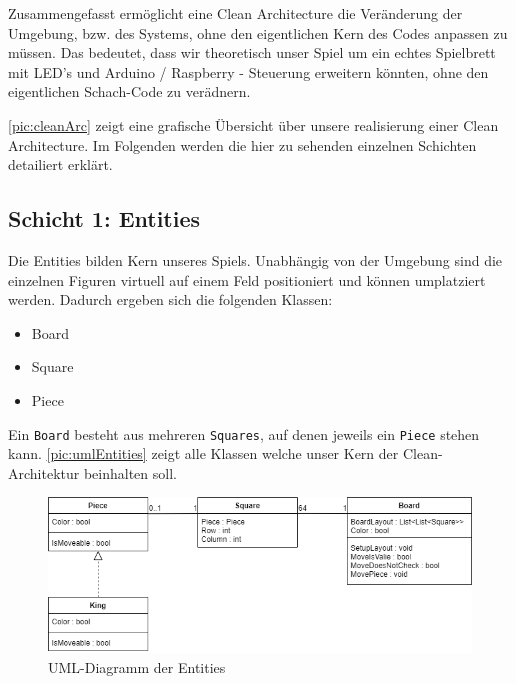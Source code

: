 \documentclass[
10pt, %
a4paper, %
oneside, %
headinclude,footinclude, %
BCOR5mm, %
]{scrartcl}
\begin{document}
\begin{onehalfspace}
Zusammengefasst ermöglicht eine Clean Architecture die Veränderung der Umgebung, bzw. des Systems, ohne den eigentlichen Kern des Codes anpassen zu müssen.
Das bedeutet, dass wir theoretisch unser Spiel um ein echtes Spielbrett mit LED's und Arduino / Raspberry - Steuerung erweitern könnten, ohne den eigentlichen Schach-Code zu verädnern.

\autoref{pic:cleanArc} zeigt eine grafische Übersicht über unsere realisierung einer Clean Architecture. Im Folgenden werden die hier zu sehenden einzelnen Schichten detailiert erklärt.

\newpage
\subsection{Schicht 1: Entities}
Die Entities bilden Kern unseres Spiels. Unabhängig von der Umgebung sind die einzelnen Figuren virtuell auf einem Feld positioniert und können umplatziert werden.
Dadurch ergeben sich die folgenden Klassen: 

\begin{center}
	\begin{itemize}
		\item Board
		\item Square
		\item Piece
	\end{itemize}
\end{center}

Ein \texttt{Board} besteht aus mehreren \texttt{Squares}, auf denen jeweils ein \texttt{Piece} stehen kann. \autoref{pic:umlEntities} zeigt alle Klassen welche unser Kern der Clean-Architektur beinhalten soll. 
\vspace{0.4cm}
\begin{figure}[h]
	\begin{center}
		\includegraphics[width=13cm]{entities.png}
		\caption{\label{pic:umlEntities} UML-Diagramm der Entities}
	\end{center}
\end{figure}


\end{onehalfspace}
\end{document}
